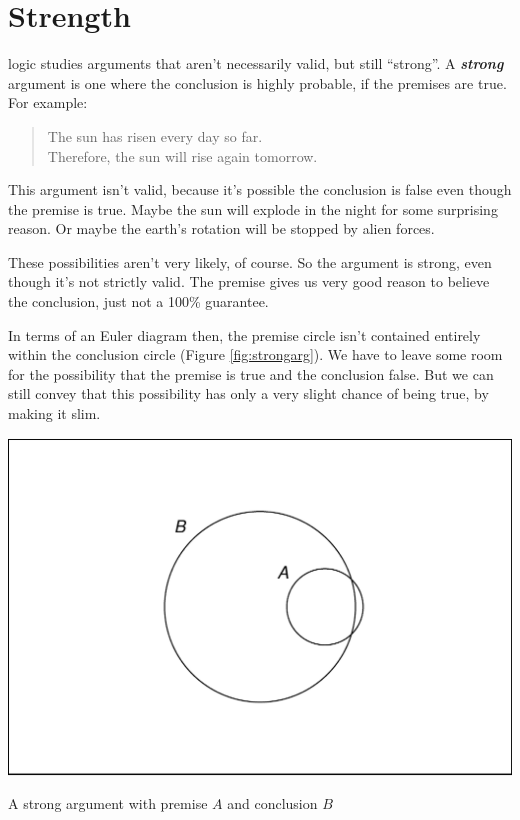 \documentclass[justified]{tufte-book}
\newenvironment{argument}{\begin{quote}\normalsize}{\end{quote}}
\theoremstyle{definition}
\theoremstyle{definition}
\theoremstyle{definition}
\theoremstyle{remark}
\begin{document}
\hypertarget{strength}{%
\section{Strength}\label{strength}}

 logic studies arguments that aren't necessarily
valid, but still ``strong''. A \textbf{\emph{strong}} argument is one
where the conclusion is highly probable, if the premises are true. For
example:

\begin{argument}
The sun has risen every day so far.\\
Therefore, the sun will rise again tomorrow.
\end{argument}

This argument isn't valid, because it's possible the conclusion is false
even though the premise is true. Maybe the sun will explode in the night
for some surprising reason. Or maybe the earth's rotation will be
stopped by alien forces.

These possibilities aren't very likely, of course. So the argument is
strong, even though it's not strictly valid. The premise gives us very
good reason to believe the conclusion, just not a 100\% guarantee.

In terms of an Euler diagram then, the premise circle isn't contained
entirely within the conclusion circle (Figure \ref{fig:strongarg}). We
have to leave some room for the possibility that the premise is true and
the conclusion false. But we can still convey that this possibility has
only a very slight chance of being true, by making it slim.

\begin{marginfigure}
\includegraphics{_main_files/figure-latex/strongarg-1} \caption[A strong argument with premise $A$ and conclusion $B$]{A strong argument with premise $A$ and conclusion $B$}\label{fig:strongarg}
\end{marginfigure}
\end{document}
